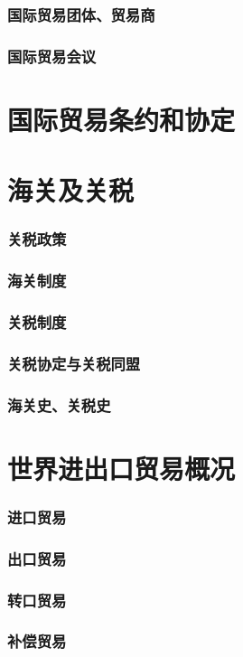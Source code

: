 \documentclass[UTF8]{../../RepresentationUniverse}
\begin{document}
    \subsubsection{国际贸易团体、贸易商}
    \subsubsection{国际贸易会议}
\section{国际贸易条约和协定}
\section{海关及关税}
    \subsubsection{关税政策}
    \subsubsection{海关制度}
    \subsubsection{关税制度}
    \subsubsection{关税协定与关税同盟}
    \subsubsection{海关史、关税史}
\section{世界进出口贸易概况}
    \subsubsection{进口贸易}
    \subsubsection{出口贸易}
    \subsubsection{转口贸易}
    \subsubsection{补偿贸易}
\end{document}
